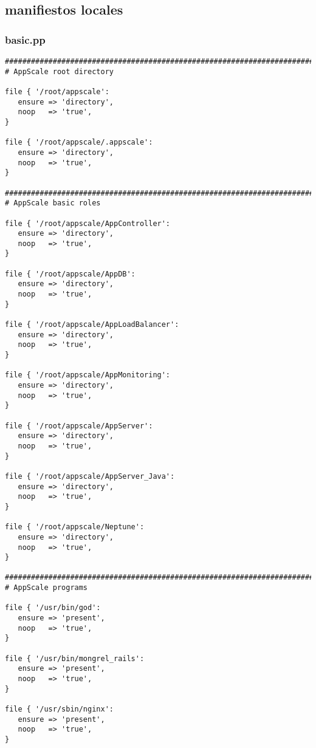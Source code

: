 \subsection{manifiestos locales}
\subsubsection{basic.pp}

\begin{lstlisting}
################################################################################
# AppScale root directory

file { '/root/appscale':
   ensure => 'directory',
   noop   => 'true',
}

file { '/root/appscale/.appscale':
   ensure => 'directory',
   noop   => 'true',
}

################################################################################
# AppScale basic roles

file { '/root/appscale/AppController':
   ensure => 'directory',
   noop   => 'true',
}

file { '/root/appscale/AppDB':
   ensure => 'directory',
   noop   => 'true',
}

file { '/root/appscale/AppLoadBalancer':
   ensure => 'directory',
   noop   => 'true',
}

file { '/root/appscale/AppMonitoring':
   ensure => 'directory',
   noop   => 'true',
}

file { '/root/appscale/AppServer':
   ensure => 'directory',
   noop   => 'true',
}

file { '/root/appscale/AppServer_Java':
   ensure => 'directory',
   noop   => 'true',
}

file { '/root/appscale/Neptune':
   ensure => 'directory',
   noop   => 'true',
}

################################################################################
# AppScale programs

file { '/usr/bin/god':
   ensure => 'present',
   noop   => 'true',
}

file { '/usr/bin/mongrel_rails':
   ensure => 'present',
   noop   => 'true',
}

file { '/usr/sbin/nginx':
   ensure => 'present',
   noop   => 'true',
}
\end{lstlisting}
